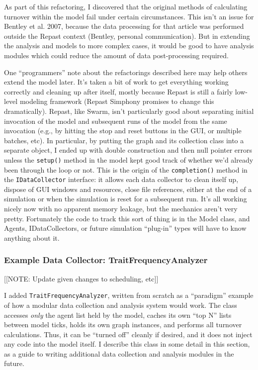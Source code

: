 \documentclass{kluwer-mem-copyright}
\begin{document}
\begin{article}
As part of this refactoring, I discovered that the original methods of
calculating turnover within the model fail under certain circumstances.  This
isn't an issue for Bentley et al. 2007, because the data processing for that
article was performed outside the Repast context (Bentley, personal
communication).  But in extending the analysis and models to more complex cases,
it would be good to have analysis modules which could reduce the amount of data
post-processing required.  

One ``programmers'' note about the refactorings described here may help others
extend the model later. It's taken a bit of work to
get everything working correctly and cleaning up after itself, mostly because
Repast is still a fairly low-level modeling framework (Repast Simphony promises
to change this dramatically). Repast, like
Swarm, isn't particularly good about separating initial invocation of the model
and subsequent runs of the model from the same invocation (e.g., by hitting the
stop and reset buttons in the GUI, or multiple batches, etc).  In particular, by
putting the graph and its collection class into a separate object, I ended up
with double construction and then null pointer errors unless the
\texttt{setup()} method in the model kept good track of whether we'd already
been through the loop or not.  This is the origin of the \texttt{completion()}
method in the \texttt{IDataCollector} interface:  it allows each data collector
to clean itself up, dispose of GUI windows and resources, close file references,
either at the end of a simulation or when the simulation is reset for a
subsequent run.  It's all working nicely now with no apparent memory leakage,
but the mechanics aren't very pretty.  Fortunately the code to track this sort of
thing is in the Model class, and Agents, IDataCollectors, or future simulation
``plug-in'' types will have to know anything about it.


\subsubsection{Example Data Collector:  TraitFrequencyAnalyzer}
[[NOTE: Update given changes to scheduling, etc]]

I added \texttt{TraitFrequencyAnalyzer}, written from scratch as a
``paradigm'' example of how a modular data collection and analysis system would
work.  The class accesses \emph{only} the agent list held by the model, caches
its own ``top N'' lists between model ticks, holds its own graph instances, and
performs all turnover calculations.  Thus, it can be ``turned off'' cleanly if
desired, and it does not inject any code into the model itself.  I describe this
class in some detail in this section, as a guide to writing additional data
collection and analysis modules in the future.  


\end{article}
\end{document}
